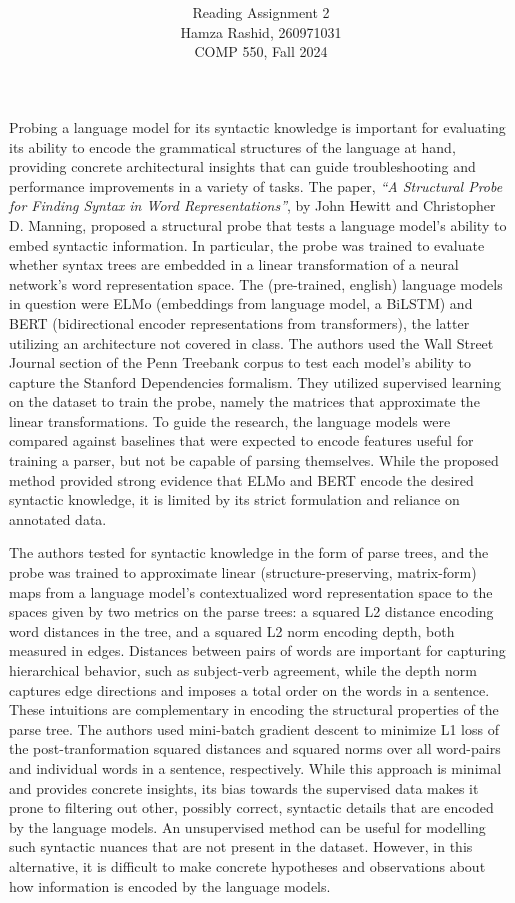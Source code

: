 \documentclass[11pt]{article}
\title{ }
\author{ Reading Assignment 2 \\ Hamza Rashid, 260971031 \\ COMP 550, Fall 2024}
\date{}
\begin{document}
\maketitle

\vspace{-5ex}
Probing a language model for its syntactic knowledge is important
for evaluating its ability to encode the grammatical structures of
the language at hand, providing concrete architectural insights 
that can guide troubleshooting and performance improvements in a variety of tasks.
The paper, \textit{“A Structural Probe for Finding 
Syntax in Word Representations”}, by John Hewitt and Christopher D. Manning,
proposed a structural probe that tests a
language model's ability to embed syntactic information. 
In particular,
the probe was trained to evaluate whether syntax trees are 
embedded in a linear transformation of a 
neural network’s word representation space.
The (pre-trained, english) language models in question were ELMo (embeddings from language model, a BiLSTM)
and BERT (bidirectional encoder representations from transformers), 
the latter utilizing an architecture not covered in class. The authors used 
the Wall Street Journal section of the 
Penn Treebank corpus to test each model's ability to capture
the Stanford Dependencies formalism. 
They utilized supervised learning on the dataset
to train the probe, namely the matrices that 
approximate the linear transformations.
To guide the research, the language models
were compared against baselines that were expected to 
encode features useful for training a parser, but not be capable of
parsing themselves. While the proposed method provided strong evidence
that ELMo and BERT encode the desired syntactic knowledge, 
it is limited by its strict formulation and reliance on annotated data.

The authors tested for syntactic knowledge 
in the form of parse trees, and
the probe was trained to approximate
linear (structure-preserving, matrix-form) maps
from a language model's contextualized word representation space to 
the spaces given by two metrics on the parse trees: 
a squared L2 distance encoding 
word distances in the tree, and
a squared L2 norm encoding depth, 
both measured in edges. Distances between pairs of words
are important for capturing hierarchical behavior, such as subject-verb agreement,
while the depth norm captures edge directions and imposes a total order 
on the words in a sentence. These intuitions are complementary 
in encoding the structural properties of the parse tree.
The authors used mini-batch gradient descent 
to minimize L1 loss of the post-tranformation squared distances and 
squared norms over all word-pairs and individual words in a sentence, respectively.
While this approach is minimal and provides concrete insights,
its bias towards the supervised data makes it prone to filtering
out other, possibly correct, syntactic details that are
encoded by the language models.
An unsupervised method can be useful for modelling such syntactic nuances
that are not present in the dataset. However, in this alternative,
it is difficult to make concrete hypotheses and observations about how
information is encoded by the language models. 
\end{document}
